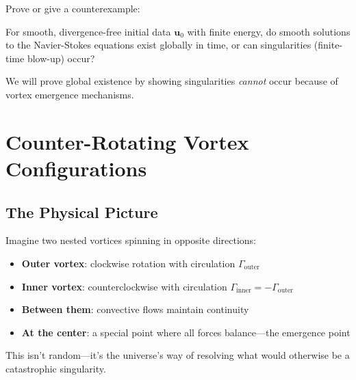 \begin{theorem}\label{thm:millennium-ns}
Prove or give a counterexample:

For smooth, divergence-free initial data $\mathbf{u}_0$ with finite energy, do smooth solutions to the Navier-Stokes equations exist globally in time, or can singularities (finite-time blow-up) occur?
\end{theorem}

We will prove global existence by showing singularities \textit{cannot} occur because of vortex emergence mechanisms.

\section{Counter-Rotating Vortex Configurations}

\subsection{The Physical Picture}

\begin{intuitive}
Imagine two nested vortices spinning in opposite directions:
\begin{itemize}
\item \textbf{Outer vortex}: clockwise rotation with circulation $\Gamma_{\text{outer}}$
\item \textbf{Inner vortex}: counterclockwise with circulation $\Gamma_{\text{inner}} = -\Gamma_{\text{outer}}$
\item \textbf{Between them}: convective flows maintain continuity
\item \textbf{At the center}: a special point where all forces balance—the emergence point
\end{itemize}

This isn't random—it's the universe's way of resolving what would otherwise be a catastrophic singularity.
\end{intuitive}

